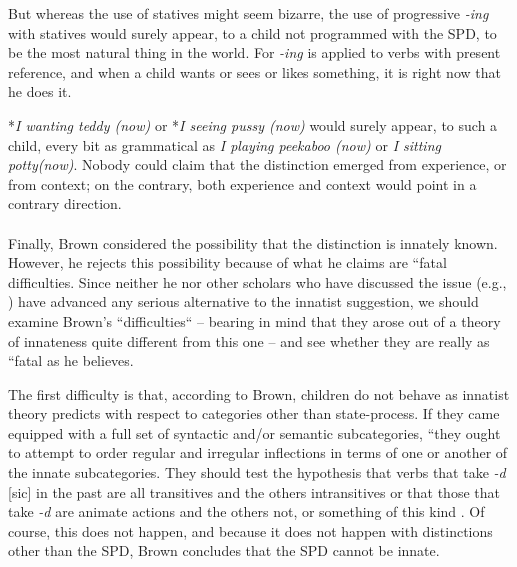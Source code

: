But whereas the use of  statives might seem bizarre, the use of progressive \textit{-ing} with statives would surely appear, to a child not programmed with the SPD, to be the most natural thing in the world. For \textit{-ing} is applied to verbs with present reference, and when a child wants or sees or likes something, it is right now that he does it.

*\textit{I wanting teddy (now)} or *\textit{I seeing pussy (now)} would surely appear, to such a child, every bit as grammatical as \textit{I playing peekaboo (now)} or \textit{I sitting potty(now)}. Nobody could claim that the distinction emerged from experience, or from context; on the contrary, both experience and context would point in a contrary direction.\\\\

Finally, Brown considered the possibility that the distinction is innately known. However, he rejects this possibility because of what he claims are ``fatal difficulties. Since neither he nor other scholars who have discussed the issue (e.g., \citealt{Kuczaj1978,Fletcher1979}) have advanced any serious alternative to the innatist suggestion, we should examine Brown's ``difficulties`` -- bearing in mind that they arose out of a theory of innateness quite different from this one -- and see whether they are really as ``fatal as he believes.

The first difficulty is that, according to Brown, children do not behave as innatist theory predicts with respect to categories other than state-process. If they came equipped with a full set of syntactic and/or semantic subcategories, ``they ought to attempt to order regular and irregular inflections in terms of one or another of the innate subcategories. They should test the hypothesis that verbs that take \textit{-d} [sic] in the past are all transitives and the others intransitives or that those that take \textit{-d} are animate actions and the others not, or something of this kind \citeyear[328]{Brown1973}. Of course, this does not happen, and because it does not happen with distinctions other than the SPD, Brown concludes that the SPD cannot be innate.

